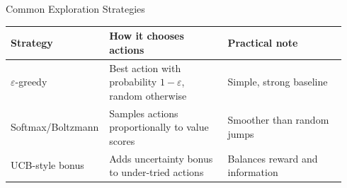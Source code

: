 \documentclass[aspectratio=169]{beamer}
\newcommand{\defaultdeckrefs}{AIMA4e Ch.22 pp.789--822; Poole3e Ch.13 pp.583--608}
\newcommand{\currentsliderefs}{\defaultdeckrefs}
\newcommand{\setslideref}[1]{\gdef\currentsliderefs{#1}}
\begin{document}
\setslideref{AIMA4e Ch.22 pp.789--822; Poole3e Ch.13 pp.583--608}
\begin{frame}{Common Exploration Strategies}
\begin{center}
\begin{tabular}{@{}p{0.24\linewidth}p{0.35\linewidth}p{0.35\linewidth}@{}}
\toprule
Strategy & How it chooses actions & Practical note \\
\midrule
$\varepsilon$-greedy & Best action with probability $1-\varepsilon$, random otherwise & Simple, strong baseline \\
Softmax/Boltzmann & Samples actions proportionally to value scores & Smoother than random jumps \\
UCB-style bonus & Adds uncertainty bonus to under-tried actions & Balances reward and information \\
\bottomrule
\end{tabular}
\end{center}
\end{frame}
\end{document}

